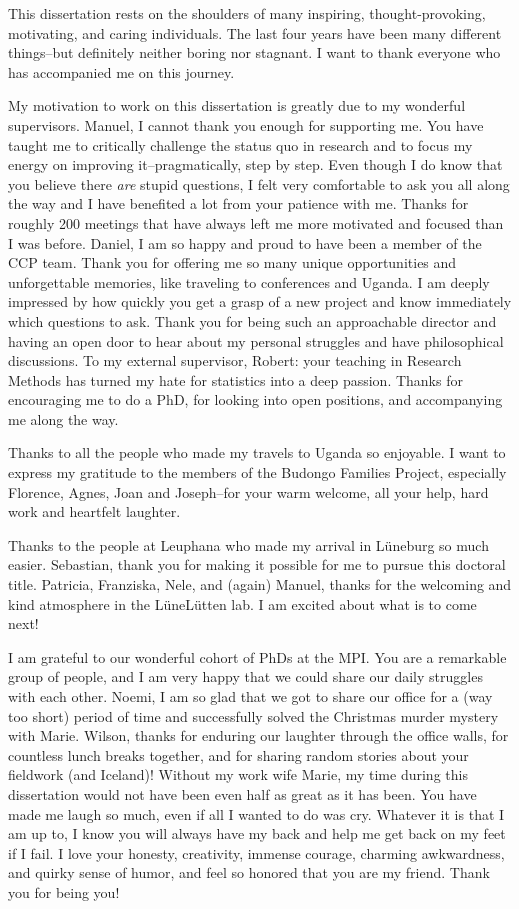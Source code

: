 \documentclass[
]{scrbook}
\begin{document}
This dissertation rests on the shoulders of many inspiring, thought-provoking, motivating, and caring individuals. The last four years have been many different things\thinspace --\thinspace but definitely neither boring nor stagnant. I want to thank everyone who has accompanied me on this journey.

My motivation to work on this dissertation is greatly due to my wonderful supervisors. Manuel, I cannot thank you enough for supporting me. You have taught me to critically challenge the status quo in research and to focus my energy on improving it\thinspace --\thinspace pragmatically, step by step. Even though I do know that you believe there \emph{are} stupid questions, I felt very comfortable to ask you all along the way and I have benefited a lot from your patience with me. Thanks for roughly 200 meetings that have always left me more motivated and focused than I was before. Daniel, I am so happy and proud to have been a member of the CCP team. Thank you for offering me so many unique opportunities and unforgettable memories, like traveling to conferences and Uganda. I am deeply impressed by how quickly you get a grasp of a new project and know immediately which questions to ask. Thank you for being such an approachable director and having an open door to hear about my personal struggles and have philosophical discussions. To my external supervisor, Robert: your teaching in Research Methods has turned my hate for statistics into a deep passion. Thanks for encouraging me to do a PhD, for looking into open positions, and accompanying me along the way.

Thanks to all the people who made my travels to Uganda so enjoyable. I want to express my gratitude to the members of the Budongo Families Project, especially Florence, Agnes, Joan and Joseph\thinspace --\thinspace for your warm welcome, all your help, hard work and heartfelt laughter.

Thanks to the people at Leuphana who made my arrival in Lüneburg so much easier. Sebastian, thank you for making it possible for me to pursue this doctoral title. Patricia, Franziska, Nele, and (again) Manuel, thanks for the welcoming and kind atmosphere in the LüneLütten lab. I am excited about what is to come next!

I am grateful to our wonderful cohort of PhDs at the MPI. You are a remarkable group of people, and I am very happy that we could share our daily struggles with each other. Noemi, I am so glad that we got to share our office for a (way too short) period of time and successfully solved the Christmas murder mystery with Marie. Wilson, thanks for enduring our laughter through the office walls, for countless lunch breaks together, and for sharing random stories about your fieldwork (and Iceland)! Without my work wife Marie, my time during this dissertation would not have been even half as great as it has been. You have made me laugh so much, even if all I wanted to do was cry. Whatever it is that I am up to, I know you will always have my back and help me get back on my feet if I fail. I love your honesty, creativity, immense courage, charming awkwardness, and quirky sense of humor, and feel so honored that you are my friend. Thank you for being you!
\end{document}
